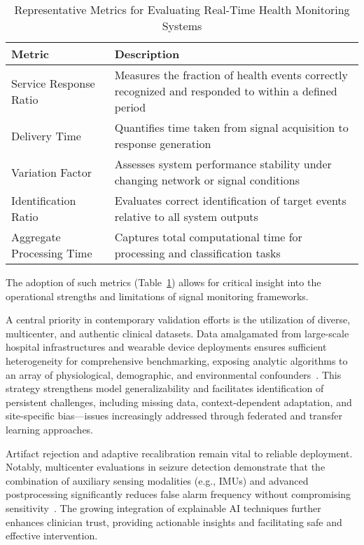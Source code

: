 \documentclass[11pt]{article}
\begin{document}
\begin{table}[htbp]
    \centering
    \caption{Representative Metrics for Evaluating Real-Time Health Monitoring Systems}
    \label{tab:eval_metrics}
    \begin{tabular}{|l|p{9cm}|}
        \hline
        \textbf{Metric} & \textbf{Description} \\
        \hline
        Service Response Ratio & Measures the fraction of health events correctly recognized and responded to within a defined period \\
        \hline
        Delivery Time & Quantifies time taken from signal acquisition to response generation \\
        \hline
        Variation Factor & Assesses system performance stability under changing network or signal conditions \\
        \hline
        Identification Ratio & Evaluates correct identification of target events relative to all system outputs \\
        \hline
        Aggregate Processing Time & Captures total computational time for processing and classification tasks \\
        \hline
    \end{tabular}
\end{table}

The adoption of such metrics (Table~\ref{tab:eval_metrics}) allows for critical insight into the operational strengths and limitations of signal monitoring frameworks.

A central priority in contemporary validation efforts is the utilization of diverse, multicenter, and authentic clinical datasets. Data amalgamated from large-scale hospital infrastructures and wearable device deployments ensures sufficient heterogeneity for comprehensive benchmarking, exposing analytic algorithms to an array of physiological, demographic, and environmental confounders~\cite{ref77,ref80,ref84,ref89,ref90,ref103,ref107}. This strategy strengthens model generalizability and facilitates identification of persistent challenges, including missing data, context-dependent adaptation, and site-specific bias—issues increasingly addressed through federated and transfer learning approaches.

Artifact rejection and adaptive recalibration remain vital to reliable deployment. Notably, multicenter evaluations in seizure detection demonstrate that the combination of auxiliary sensing modalities (e.g., IMUs) and advanced postprocessing significantly reduces false alarm frequency without compromising sensitivity~\cite{ref103}. The growing integration of explainable AI techniques further enhances clinician trust, providing actionable insights and facilitating safe and effective intervention.
\end{document}
